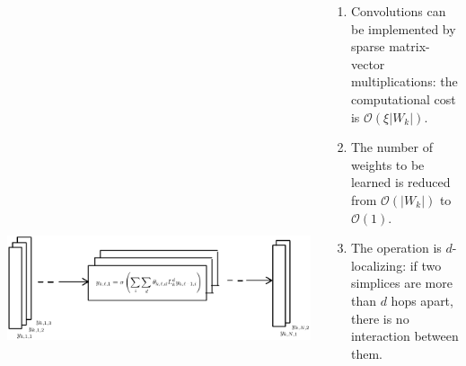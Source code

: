 \documentclass[landscape,a0paper,blockverticalspace = 5mm]{tikzposter}
\begin{document}
\begin{columns}
{{%
\vspace{-0.8cm}
    \begin{center}
          \includegraphics[height=17.5cm]{figures/snns_figure.pdf}
          \end{center}

\begin{enumerate}
\vspace{-1.4cm}
\item Convolutions can be implemented by sparse matrix-vector multiplications: the computational cost is $\mathcal{O}(\xi\lvert W_k\rvert)$.
\item The number of weights to be learned is reduced from $\mathcal{O}(\lvert W_k\rvert)$ to $\mathcal{O}(1)$.
\item The operation is $d$-localizing: if two simplices are more than $d$ hops apart, there is no interaction between them.
\end{enumerate}
\vspace{-0.8cm}
}    
    
}
\end{columns}
\end{document}
